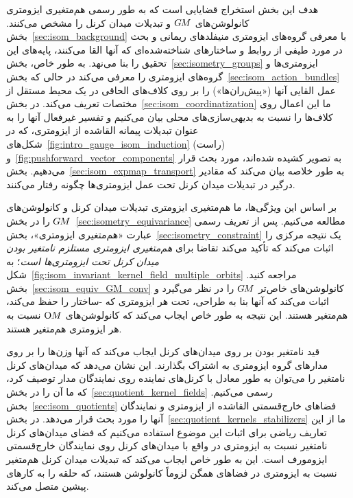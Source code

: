 \etocsettocstyle{}{} %
\localtableofcontents


هدف این بخش استخراج قضایایی است که به طور رسمی هم‌متغیری ایزومتری کانولوشن‌های $G\mkern-1.4muM$ و تبدیلات میدان کرنل را مشخص می‌کنند.
بخش~\ref{sec:isom_background} با معرفی گروه‌های ایزومتری منیفلدهای ریمانی و بحث در مورد طیفی از روابط و ساختارهای شناخته‌شده‌ای که آنها القا می‌کنند، پایه‌های این تحقیق را بنا می‌نهد.
به طور خاص، بخش~\ref{sec:isometry_groups} ایزومتری‌ها و گروه‌های ایزومتری را معرفی می‌کند در حالی که بخش~\ref{sec:isom_action_bundles} عمل القایی آنها («پیش‌ران‌ها») را بر روی کلاف‌های الحاقی در یک محیط مستقل از مختصات تعریف می‌کند.
در بخش~\ref{sec:isom_coordinatization} ما این اعمال روی کلاف‌ها را نسبت به بدیهی‌سازی‌های محلی بیان می‌کنیم و تفسیر غیرفعال آنها را به عنوان تبدیلات پیمانه القاشده از ایزومتری، که در شکل‌های~\ref{fig:intro_gauge_isom_induction} (راست) و~\ref{fig:pushforward_vector_components} به تصویر کشیده شده‌اند، مورد بحث قرار می‌دهیم.
بخش~\ref{sec:isom_expmap_transport} به طور خلاصه بیان می‌کند که مقادیر درگیر در تبدیلات میدان کرنل تحت عمل ایزومتری‌ها چگونه رفتار می‌کنند.


بر اساس این ویژگی‌ها، ما هم‌متغیری ایزومتری تبدیلات میدان کرنل و کانولوشن‌های $G\mkern-1.4muM$ را در بخش~\ref{sec:isometry_equivariance} مطالعه می‌کنیم.
پس از تعریف رسمی عبارت «هم‌متغیری ایزومتری»، بخش~\ref{sec:isometry_constraint} یک نتیجه مرکزی را اثبات می‌کند که تأکید می‌کند تقاضا برای \emph{هم‌متغیری ایزومتری مستلزم نامتغیر بودن میدان کرنل تحت ایزومتری‌ها است}؛ به شکل~\ref{fig:isom_invariant_kernel_field_multiple_orbits} مراجعه کنید.
بخش~\ref{sec:isom_equiv_GM_conv} کانولوشن‌های خاص‌تر $G\mkern-1.4muM$ را در نظر می‌گیرد و اثبات می‌کند که آنها بنا به طراحی، تحت هر ایزومتری که -ساختار را حفظ می‌کند، هم‌متغیر هستند.
این نتیجه به طور خاص ایجاب می‌کند که کانولوشن‌های $\operatorname{O}\mkern-3.6muM$ نسبت به هر ایزومتری هم‌متغیر هستند.


قید نامتغیر بودن بر روی میدان‌های کرنل ایجاب می‌کند که آنها وزن‌ها را بر روی مدارهای گروه ایزومتری به اشتراک بگذارند.
این نشان می‌دهد که میدان‌های کرنل نامتغیر را می‌توان به طور معادل با کرنل‌های نماینده روی نمایندگان مدار توصیف کرد، که ما آن را در بخش~\ref{sec:quotient_kernel_fields} رسمی می‌کنیم.
بخش~\ref{sec:isom_quotients} فضاهای خارج‌قسمتی القاشده از ایزومتری و نمایندگان آنها را مورد بحث قرار می‌دهد.
در بخش~\ref{sec:quotient_kernels_stabilizers} ما از این تعاریف ریاضی برای اثبات این موضوع استفاده می‌کنیم که فضای میدان‌های کرنل نامتغیر نسبت به ایزومتری در واقع با میدان‌های کرنل روی نمایندگان خارج‌قسمتی ایزومورف است.
این به طور خاص ایجاب می‌کند که تبدیلات میدان کرنل هم‌متغیر نسبت به ایزومتری در فضاهای همگن لزوماً کانولوشن هستند، که حلقه را به کارهای پیشین متصل می‌کند.